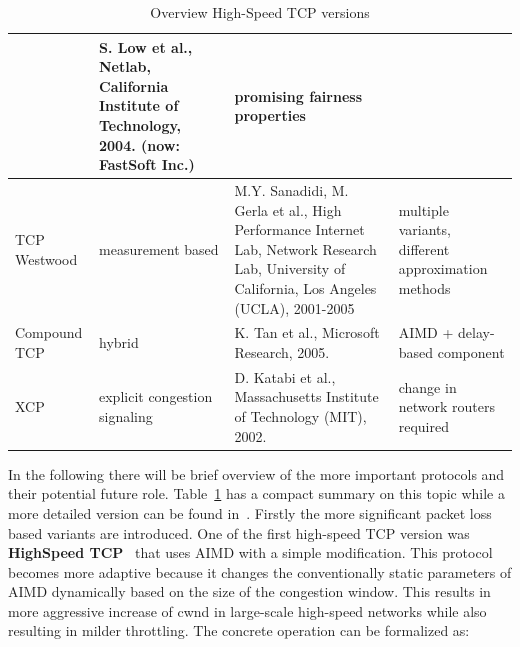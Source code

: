 \documentclass[a4paper]{article}
\begin{document}
\begin{table}
\begin{tabular}{|p{}|p{}|p{}|p{}|}
                                                                                      & S. Low et al., Netlab,
        California Institute of Technology, 2004. (now:
        FastSoft Inc.)                                                                & promising fairness properties
        \\\hline
        \cellcolor{blue!25}TCP Westwood                                               & measurement based
                                                                                      & M.Y. Sanadidi, M. Gerla et al.,
        High Performance Internet Lab,
        Network Research Lab, University of California, Los Angeles (UCLA), 2001-2005 & multiple variants, different
        approximation methods
        \\\hline
        \cellcolor{blue!25}Compound TCP                                               & hybrid
                                                                                      & K. Tan et al., Microsoft
        Research, 2005.                                                               & AIMD + delay-based
        component
        \\\hline
        \cellcolor{blue!25}XCP                                                        & explicit congestion signaling
                                                                                      & D. Katabi et al., Massachusetts
        Institute of Technology (MIT),
        2002.                                                                         & change in network routers
        required
        \\\hline
    \end{tabular}
    \caption{Overview High-Speed TCP versions}
    \label{table:tcpver}
\end{table}

In the following there will be brief overview of the more important protocols and their potential future role.
Table~\ref{table:tcpver} has a compact summary on this topic while a more detailed version can be found
in~\cite{TCPFairnessAnalysis}. Firstly the more significant packet loss based variants are introduced. One of the first
high-speed TCP version was \textbf{HighSpeed TCP}~\cite{HighSpeedTCP} that uses AIMD with a simple modification. This
protocol becomes more adaptive because it changes the conventionally static parameters of AIMD dynamically based on the
size of the congestion window. This results in more aggressive increase of cwnd in large-scale high-speed networks
while also resulting in milder throttling. The concrete operation can be formalized as:
\end{document}
